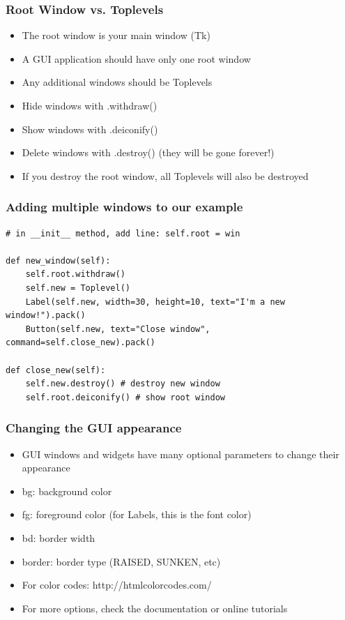\begin{frame}[fragile] \frametitle{Root Window vs. Toplevels}
\begin{itemize}
\item The root window is your main window (Tk)
\item A GUI application should have only one root window
\item Any additional windows should be Toplevels
\item Hide windows with .withdraw()
\item Show windows with .deiconify()
\item Delete windows with .destroy() (they will be gone forever!)
\item If you destroy the root window, all Toplevels will also be destroyed

\end{itemize}
\end{frame}

\begin{frame}[fragile] \frametitle{Adding multiple windows to our example}
\begin{lstlisting}
# in __init__ method, add line: self.root = win

def new_window(self):
	self.root.withdraw()
	self.new = Toplevel()
	Label(self.new, width=30, height=10, text="I'm a new window!").pack()
	Button(self.new, text="Close window", command=self.close_new).pack()

def close_new(self):
	self.new.destroy() # destroy new window
	self.root.deiconify() # show root window

\end{lstlisting}
\end{frame}


\begin{frame}[fragile] \frametitle{Changing the GUI appearance}
\begin{itemize}
\item GUI windows and widgets have many optional parameters to change their appearance
\item bg: background color
\item fg: foreground color (for Labels, this is the font color)
\item bd: border width
\item border: border type (RAISED, SUNKEN, etc)
\item For color codes: http://htmlcolorcodes.com/
\item For more options, check the documentation or online tutorials
\end{itemize}
\end{frame}

